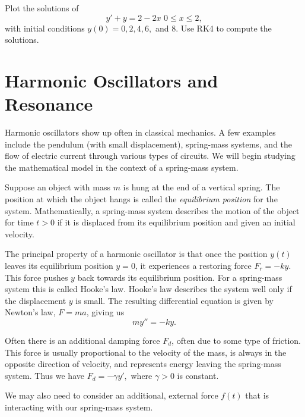 \begin{problem}
Plot the solutions of 
\[ y' + y = 2-2x\,\, 0 \leq x \leq 2, \] 
with initial conditions $y(0) = 0, 2, 4, 6, $ and $8$. Use RK4 to compute the solutions. 
\end{problem}

\pagebreak
\section{Harmonic Oscillators and Resonance}

Harmonic oscillators show up often in classical mechanics. A few examples include the pendulum (with small displacement), spring-mass systems, and the flow of electric current through various types of circuits. We will begin studying the mathematical model in the context of a spring-mass system.
%

Suppose an object with mass $m$ is hung at the end of a vertical spring. The position at which the object hangs is called the \textit{equilibrium position} for the system. Mathematically, a spring-mass system describes the motion of the object for time $t > 0$  if it is displaced from its equilibrium position and given an initial velocity. 

The principal property of a harmonic oscillator is that once the position $y(t)$ leaves its equilibrium position $y = 0$, it experiences a restoring force $F_r = -ky.$ This force pushes $y$ back towards its equilibrium position. For a spring-mass system this is called Hooke's law. Hooke's law describes the system well only if the displacement $y$ is small. The resulting differential equation is given by Newton's law, $F = ma$, giving us 
\[my'' = -ky.\]

Often there is an additional damping force $F_d$, often due to some type of friction. This force is usually proportional to the velocity of the mass, is always in the opposite direction of velocity, and represents energy leaving the spring-mass system. Thus we have $F_d = -\gamma y', $ where $ \gamma > 0$ is constant. 

We may also need to consider an additional, external force $f(t)$ that is interacting with our spring-mass system.

